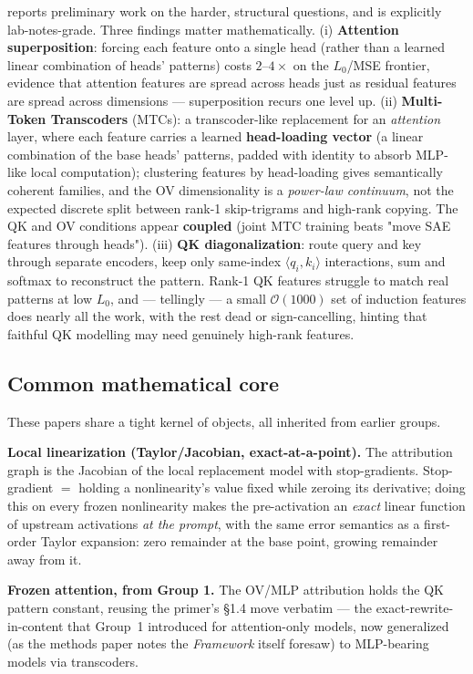 \textcite{progress-on-attention} reports preliminary work on the harder, structural questions, and is explicitly lab-notes-grade. Three findings matter mathematically. (i) \textbf{Attention superposition}: forcing each feature onto a single head (rather than a learned linear combination of heads' patterns) costs $2$--$4\times$ on the $L_0$/MSE frontier, evidence that attention features are spread across heads just as residual features are spread across dimensions --- superposition recurs one level up. (ii) \textbf{Multi-Token Transcoders} (MTCs): a transcoder-like replacement for an \emph{attention} layer, where each feature carries a learned \textbf{head-loading vector} (a linear combination of the base heads' patterns, padded with identity to absorb MLP-like local computation); clustering features by head-loading gives semantically coherent families, and the OV dimensionality is a \emph{power-law continuum}, not the expected discrete split between rank-1 skip-trigrams and high-rank copying. The QK and OV conditions appear \textbf{coupled} (joint MTC training beats "move SAE features through heads"). (iii) \textbf{QK diagonalization}: route query and key through separate encoders, keep only same-index $\langle q_i,k_i\rangle$ interactions, sum and softmax to reconstruct the pattern. Rank-1 QK features struggle to match real patterns at low $L_0$, and --- tellingly --- a small $\mathcal O(1000)$ set of induction features does nearly all the work, with the rest dead or sign-cancelling, hinting that faithful QK modelling may need genuinely high-rank features.

\subsection*{Common mathematical core}

These papers share a tight kernel of objects, all inherited from earlier groups.

\textbf{Local linearization (Taylor/Jacobian, exact-at-a-point).} The attribution graph is the Jacobian of the local replacement model with stop-gradients. Stop-gradient $=$ holding a nonlinearity's value fixed while zeroing its derivative; doing this on every frozen nonlinearity makes the pre-activation an \emph{exact} linear function of upstream activations \emph{at the prompt}, with the same error semantics as a first-order Taylor expansion: zero remainder at the base point, growing remainder away from it.

\textbf{Frozen attention, from Group 1.} The OV/MLP attribution holds the QK pattern constant, reusing the primer's §1.4 move verbatim --- the exact-rewrite-in-content that Group~1 introduced for attention-only models, now generalized (as the methods paper notes the \emph{Framework} itself foresaw) to MLP-bearing models via transcoders.

